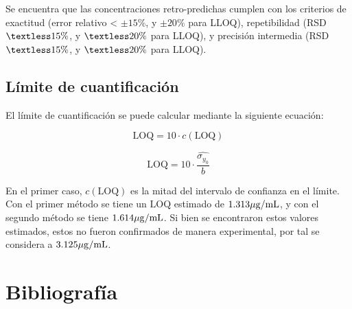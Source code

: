 \documentclass{article}
\begin{document}
\begin{info}
	Se encuentra que las concentraciones retro-predichas cumplen con los criterios de exactitud (error relativo < $\pm 15\%$, y $\pm 20\% $ para LLOQ), repetibilidad (RSD $\textless15\% $, y $\textless20\%$ para LLOQ), y precisión intermedia (RSD $\textless15\% $, y $\textless20\%$ para LLOQ).
\end{info}

\subsection{Límite de cuantificación}
El límite de cuantificación se puede calcular mediante la siguiente ecuación:

\begin{equation}\label{Eq:7}
	\mathrm{LOQ} = 10\cdot c(\mathrm{LOQ})
\end{equation}

\begin{equation}\label{Eq:8}
\mathrm{LOQ} = 10\cdot \frac{\hat{\sigma_{y_0}}}{b}
\end{equation}

\noindent
En el primer caso, $c(\mathrm{LOQ})$ es la mitad del intervalo de confianza en el límite. Con el primer método se tiene un $ \mathrm{LOQ} $ estimado de $1.313\mathrm{\mu g/mL} $, y con el segundo método  se tiene $1.614\mathrm{\mu g/mL}$. Si bien se encontraron estos valores estimados, estos no fueron confirmados de manera experimental, por tal se considera a $3.125\mathrm{\mu g/mL}$.


\section*{Bibliografía}

\end{document}
